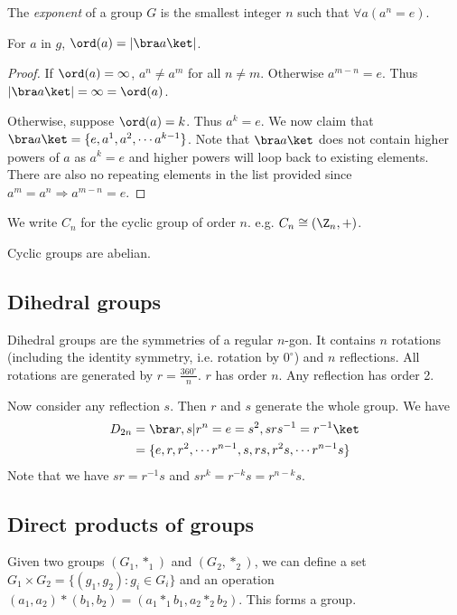 \documentclass[a4paper]{article}
\begin{document}
  \begin{defi}
    The \emph{exponent} of a group $G$ is the smallest integer $n$ such that $\forall a(a^n = e)$.
  \end{defi}
  \begin{lemma}
    For $a$ in $g$, $\ord (a) = |\bra a\ket|$.
  \end{lemma}
  \begin{proof}
    If $\ord (a) = \infty$, $a^n \not= a^m$ for all $n\not= m$. Otherwise $a^{m-n} = e$. Thus $|\bra a\ket| = \infty = \ord (a)$.

    Otherwise, suppose $\ord (a) = k$. Thus $a^k = e$. We now claim that $\bra a\ket = \{e, a^1, a^2, \cdots a^{k-1}\}$. Note that $\bra a\ket$ does not contain higher powers of $a$ as $a^k = e$ and higher powers will loop back to existing elements. There are also no repeating elements in the list provided since $a^m = a^n \Rightarrow a^{m-n} = e$.
  \end{proof}

  \begin{notation}
    We write $C_n$ for the cyclic group of order $n$. e.g. $C_n \cong (\Z_n, +)$.
  \end{notation}

  \begin{prop}
    Cyclic groups are abelian.
  \end{prop}

  \subsection{Dihedral groups}
  \begin{defi}
    Dihedral groups are the symmetries of a regular $n$-gon. It contains $n$ rotations (including the identity symmetry, i.e. rotation by $0^\circ$) and $n$ reflections. All rotations are generated by $r = \frac{360^\circ}{n}$. $r$ has order $n$. Any reflection has order 2.

    Now consider any reflection $s$. Then $r$ and $s$ generate the whole group. We have
    \begin{align*}
      D_{2n} &= \bra r, s|r^n=e=s^2, srs^{-1} = r^{-1}\ket\\
      &= \{e, r, r^2, \cdots r^{n-1}, s, rs, r^2s, \cdots r^{n-1}s\}
    \end{align*}
    Note that we have $sr=r^{-1}s$ and $sr^k = r^{-k}s = r^{n-k}s$.
  \end{defi}

  \subsection{Direct products of groups}
  \begin{defi}
    Given two groups $(G_1, *_1)$ and $(G_2, *_2)$, we can define a set $G_1\times G_2 = \{(g_1, g_2): g_i\in G_i\}$ and an operation $(a_1, a_2)*(b_1, b_2) = (a_1*_1b_1, a_2*_2b_2)$. This forms a group.
  \end{defi}
\end{document}
